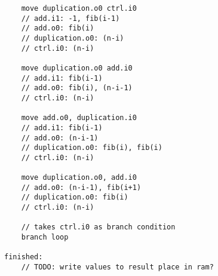 \documentclass[adraft]{eptcs}
\begin{document}
\begin{appendices}
\begin{lstlisting}
	move duplication.o0 ctrl.i0
	// add.i1: -1, fib(i-1)
	// add.o0: fib(i)
	// duplication.o0: (n-i)
	// ctrl.i0: (n-i)
	
	move duplication.o0 add.i0
	// add.i1: fib(i-1)
	// add.o0: fib(i), (n-i-1)
	// ctrl.i0: (n-i)
	
	move add.o0, duplication.i0
	// add.i1: fib(i-1)
	// add.o0: (n-i-1)
	// duplication.o0: fib(i), fib(i)
	// ctrl.i0: (n-i)
	
	move duplication.o0, add.i0
	// add.o0: (n-i-1), fib(i+1)
	// duplication.o0: fib(i)
	// ctrl.i0: (n-i)
	
	// takes ctrl.i0 as branch condition
	branch loop

finished:
	// TODO: write values to result place in ram?
			\end{lstlisting}
	
	\end{appendices}
	
\end{document}
